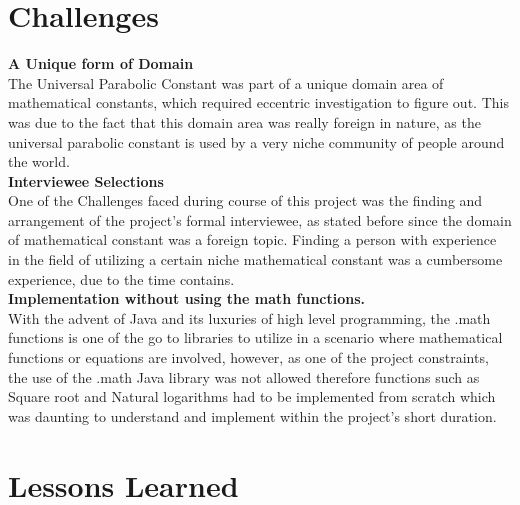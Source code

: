 \documentclass[30pt,a0,portrait]{a0poster}
\begin{document}
\begin{multicols}{2}

\section*{Challenges}

\noindent \textbf{A Unique form of Domain}\\

\noindent The Universal Parabolic Constant was part of a unique domain area of mathematical constants, which required eccentric investigation to figure out. This was due to the fact that this domain area was really foreign in nature,  as the universal parabolic constant is used by a very niche community of people around the world.\\

\noindent \textbf{Interviewee Selections}\\

\noindent One of the Challenges faced during course of this project was the finding and arrangement of the project's formal interviewee, as stated before since the domain of mathematical constant was a foreign topic. Finding a person with experience in the field of utilizing a certain niche mathematical constant was a cumbersome experience, due to the time contains. \\

\noindent \textbf {Implementation without using the math functions.}\\

\noindent With the advent of Java and its luxuries of high level programming, the .math functions is one of the go to libraries to utilize in a scenario where mathematical functions or equations are involved, however, as one of the project constraints, the use of the .math Java library was not allowed therefore functions such as Square root and Natural logarithms had to be implemented from scratch which was daunting to understand and implement within the project's short duration.




\section*{Lessons Learned}


\end{multicols}
\end{document}
